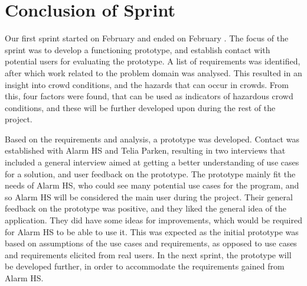 \section{Conclusion of Sprint}
Our first sprint started on February  and ended on February . The focus of the sprint was to develop a functioning prototype, and establish contact with potential users for evaluating the prototype. A list of requirements was identified, after which work related to the problem domain was analysed. This resulted in an insight into crowd conditions, and the hazards that can occur in crowds. From this, four factors were found, that can be used as indicators of hazardous crowd conditions, and these will be further developed upon during the rest of the project.

Based on the requirements and analysis, a prototype was developed. Contact was established with Alarm HS and Telia Parken, resulting in two interviews that included a general interview aimed at getting a better understanding of use cases for a solution, and user feedback on the prototype. The prototype mainly fit the needs of Alarm HS, who could see many potential use cases for the program, and so Alarm HS will be considered the main user during the project. Their general feedback on the prototype was positive, and they liked the general idea of the application. They did have some ideas for improvements, which would be required for Alarm HS to be able to use it. This was expected as the initial prototype was based on assumptions of the use cases and requirements, as opposed to use cases and requirements elicited from real users. In the next sprint, the prototype will be developed further, in order to accommodate the requirements gained from Alarm HS.






